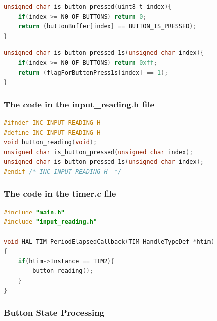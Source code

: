 

\begin{lstlisting}[caption=Checking a button is pressed or not,language=C]
unsigned char is_button_pressed(uint8_t index){
	if(index >= N0_OF_BUTTONS) return 0;
	return (buttonBuffer[index] == BUTTON_IS_PRESSED);
}
\end{lstlisting}
\begin{lstlisting}[caption=Checking a button is pressed more than a second or not,language=C]
unsigned char is_button_pressed_1s(unsigned char index){
	if(index >= N0_OF_BUTTONS) return 0xff;
	return (flagForButtonPress1s[index] == 1);
}
\end{lstlisting}
\subsubsection{The code in the input\_reading.h file}
\begin{lstlisting}[caption=Prototype in input\_reading.h file,language=C]
#ifndef INC_INPUT_READING_H_
#define INC_INPUT_READING_H_
void button_reading(void);
unsigned char is_button_pressed(unsigned char index);
unsigned char is_button_pressed_1s(unsigned char index);
#endif /* INC_INPUT_READING_H_ */
\end{lstlisting}

\subsubsection{The code in the timer.c file}
\begin{lstlisting}[caption=Timer interrupt callback function,language=C]
#include "main.h"
#include "input_reading.h"

void HAL_TIM_PeriodElapsedCallback(TIM_HandleTypeDef *htim)
{
	if(htim->Instance == TIM2){
		button_reading();
	}
}

\end{lstlisting}



\newpage
\subsubsection{Button State Processing}
